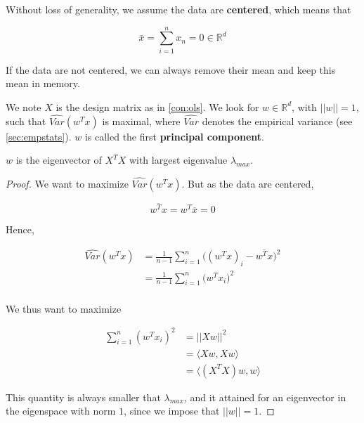 \documentclass[
10pt, %
a4paper, %
oneside, %
headinclude,footinclude, %
BCOR5mm, %
]{scrartcl}
\begin{document}
Without loss of generality, we assume the data are \textbf{{centered}}, which means that

\begin{equation}
\bar{x} = \sum^{n}_{i=1} x_n=0\in \mathbb{R}^d
\end{equation}

If the data are not centered, we can always remove their mean and keep this mean in memory.

We note $X$ is the design matrix as in \ref{con:ols}. We look for $w\in \mathbb{R}^d$, with $||w||=1$, such that $ \hat{Var}(w^Tx)$ is maximal, where $ \hat{Var}$ denotes the empirical variance (see \ref{sec:empstats}). $w$ is called the first \textbf{principal component}.

\begin{proposition}
    $w$ is the eigenvector of $X^TX$ with largest eigenvalue $\lambda_{max}$.
\end{proposition}

\begin{proof}
    We want to maximize $ \hat{Var}(w^Tx)$. But as the data are centered, 

    \begin{equation}
            \label{eq:}
            \overline{w^Tx} = w^T \overline{x} = 0
    \end{equation}

    Hence,

    \begin{equation}
        \begin{aligned}
            \label{eq:}
	    \hat{Var}(w^Tx) &= \frac{1}{n-1}  \sum^{n}_{i=1} \big((w^Tx)_i- \overline{w^Tx}  \big)^2\\
	    &= \frac{1}{n-1}  \sum^{n}_{i=1} \big(w^Tx_i \big)^2\\
        \end{aligned}
    \end{equation}

    We thus want to maximize

    \begin{equation*}
        \begin{aligned}
	    \sum^{n}_{i=1} (w^Tx_i)^2 &= ||Xw||^2\\
	    &= \langle Xw, Xw \rangle\\
	    &= \langle (X^TX)w, w \rangle
        \end{aligned}
    \end{equation*}

    This quantity is always smaller that $\lambda_{max}$, and it attained for an eigenvector in the eigenspace with norm $1$, since we impose that $||w||=1$.

\end{proof}
\end{document}

